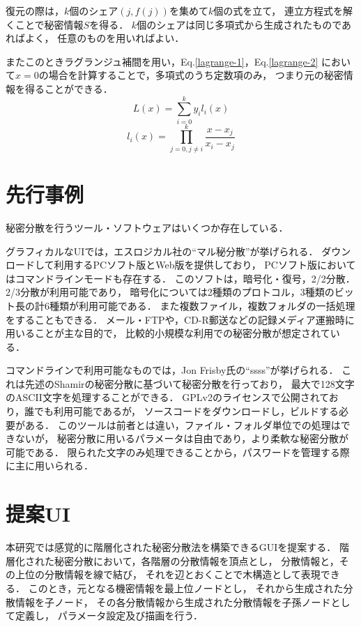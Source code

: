 \documentclass[fleqn, uplatex]{jsarticle}
\begin{document}
復元の際は，$k$個のシェア$(j,f(j))$を集めて$k$個の式を立て，%
連立方程式を解くことで秘密情報$S$を得る．
$k$個のシェアは同じ多項式から生成されたものであればよく，%
任意のものを用いればよい．

またこのときラグランジュ補間を用い，Eq.\ref{lagrange-1}，Eq.\ref{lagrange-2}%
において$x=0$の場合を計算することで，多項式のうち定数項のみ，%
つまり元の秘密情報を得ることができる．
%
\begin{equation}
L(x) = \sum_{i=0}^{k}y_{i}l_{i}(x) \label{lagrange-1}
\end{equation}
%
\begin{equation}
l_{i}(x) = \prod_{j=0,j{\neq}i}^{k}{\frac{x-x_{j}}{x_{i}-x_{j}}} \label{lagrange-2}
\end{equation}

\section{先行事例}
秘密分散を行うツール・ソフトウェアはいくつか存在している．

グラフィカルなUIでは，エスロジカル社の``マル秘分散''\cite{lit:maruhi}が挙げられる．%
ダウンロードして利用するPCソフト版とWeb版を提供しており，%
PCソフト版においてはコマンドラインモードも存在する．%
このソフトは，暗号化・復号，2/2分散．2/3分散が利用可能であり，%
暗号化については2種類のプロトコル，3種類のビット長の計6種類が利用可能である．
また複数ファイル，複数フォルダの一括処理をすることもできる．
メール・FTPや，CD-R郵送などの記録メディア運搬時に用いることが主な目的で，%
比較的小規模な利用での秘密分散が想定されている．

コマンドラインで利用可能なものでは，Jon Frisby氏の``ssss''\cite{lit:ssss}が挙げられる．%
これは先述のShamirの秘密分散に基づいて秘密分散を行っており，%
最大で128文字のASCII文字を処理することができる．
GPLv2のライセンスで公開されており，誰でも利用可能であるが，%
ソースコードをダウンロードし，ビルドする必要がある．%
このツールは前者とは違い，ファイル・フォルダ単位での処理はできないが，%
秘密分散に用いるパラメータは自由であり，より柔軟な秘密分散が可能である．%
限られた文字のみ処理できることから，パスワードを管理する際に主に用いられる．

\section{提案UI}
本研究では感覚的に階層化された秘密分散法を構築できるGUIを提案する．%
階層化された秘密分散において，各階層の分散情報を頂点とし，%
分散情報と，その上位の分散情報を線で結び，%
それを辺とおくことで木構造として表現できる．
このとき，元となる機密情報を最上位ノードとし，%
それから生成された分散情報を子ノード，%
その各分散情報から生成された分散情報を子孫ノードとして定義し，%
パラメータ設定及び描画を行う．
\end{document}
